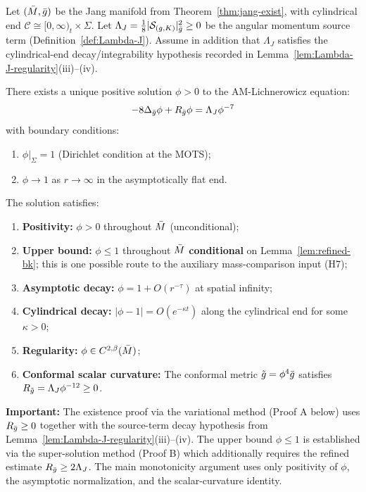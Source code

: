 \begin{theorem}\label{thm:lich-exist}
Let $(\bar{M}, \bar{g})$ be the Jang manifold from Theorem~\ref{thm:jang-exist}, with cylindrical end $\mathcal{C} \cong [0,\infty)_t \times \Sigma$. Let $\Lambda_J = \frac{1}{8}|\mathcal{S}_{(g,K)}|^2_{\bar{g}} \geq 0$ be the angular momentum source term (Definition~\ref{def:Lambda-J}).
Assume in addition that $\Lambda_J$ satisfies the cylindrical-end decay/integrability hypothesis recorded in Lemma~\ref{lem:Lambda-J-regularity}(iii)--(iv).

There exists a unique positive solution $\phi > 0$ to the AM-Lichnerowicz equation:
\begin{equation}\label{eq:am-lich-exist}
-8\Delta_{\bar{g}}\phi + R_{\bar{g}}\phi = \Lambda_J \phi^{-7}
\end{equation}
with boundary conditions:
\begin{enumerate}[label=\textup{(\roman*)}]
    \item $\phi|_\Sigma = 1$ (Dirichlet condition at the MOTS);
    \item $\phi \to 1$ as $r \to \infty$ in the asymptotically flat end.
\end{enumerate}

The solution satisfies:
\begin{enumerate}[label=\textup{(\alph*)}]
    \item \textbf{Positivity:} $\phi > 0$ throughout $\bar{M}$ (unconditional);
    \item \textbf{Upper bound:} $\phi \leq 1$ throughout $\bar{M}$ \textbf{conditional} on Lemma~\ref{lem:refined-bk}; this is one possible route to the auxiliary mass-comparison input (H7);
    \item \textbf{Asymptotic decay:} $\phi = 1 + O(r^{-\tau})$ at spatial infinity;
    \item \textbf{Cylindrical decay:} $|\phi - 1| = O(e^{-\kappa t})$ along the cylindrical end for some $\kappa > 0$;
    \item \textbf{Regularity:} $\phi \in C^{2,\beta}(\bar{M})$;
    \item \textbf{Conformal scalar curvature:} The conformal metric $\tilde{g} = \phi^4 \bar{g}$ satisfies $R_{\tilde{g}} = \Lambda_J \phi^{-12} \geq 0$.
\end{enumerate}

\textbf{Important:} The existence proof via the variational method (Proof A below) uses $R_{\bar{g}} \geq 0$ together with the source-term decay hypothesis from Lemma~\ref{lem:Lambda-J-regularity}(iii)--(iv). The upper bound $\phi \leq 1$ is established via the super-solution method (Proof B) which additionally requires the refined estimate $R_{\bar{g}} \geq 2\Lambda_J$. The main monotonicity argument uses only positivity of $\phi$, the asymptotic normalization, and the scalar-curvature identity.
\end{theorem}

